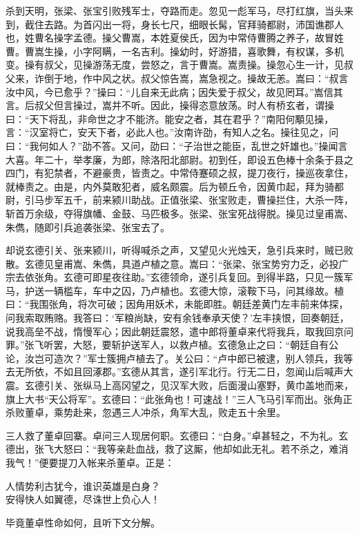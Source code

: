 \documentclass[a4paper]{article}
\begin{document}
杀到天明，张梁、张宝引败残军士，夺路而走。忽见一彪军马，尽打红旗，当头来到，截住去路。为首闪出一将，身长七尺，细眼长髯，官拜骑都尉，沛国谯郡人也，姓曹名操字孟德。操父曹嵩，本姓夏侯氏，因为中常侍曹腾之养子，故冒姓曹。曹嵩生操，小字阿瞒，一名吉利。操幼时，好游猎，喜歌舞，有权谋，多机变。操有叔父，见操游荡无度，尝怒之，言于曹嵩。嵩责操。操忽心生一计，见叔父来，诈倒于地，作中风之状。叔父惊告嵩，嵩急视之。操故无恙。嵩曰：“叔言汝中风，今已愈乎？”操曰：“儿自来无此病；因失爱于叔父，故见罔耳。”嵩信其言。后叔父但言操过，嵩并不听。因此，操得恣意放荡。时人有桥玄者，谓操曰：“天下将乱，非命世之才不能济。能安之者，其在君乎？”南阳何顒见操，言：“汉室将亡，安天下者，必此人也。”汝南许劭，有知人之名。操往见之，问曰：“我何如人？”劭不答。又问，劭曰：“子治世之能臣，乱世之奸雄也。”操闻言大喜。年二十，举孝廉，为郎，除洛阳北部尉。初到任，即设五色棒十余条于县之四门，有犯禁者，不避豪贵，皆责之。中常侍蹇硕之叔，提刀夜行，操巡夜拿住，就棒责之。由是，内外莫敢犯者，威名颇震。后为顿丘令，因黄巾起，拜为骑都尉，引马步军五千，前来颍川助战。正值张梁、张宝败走，曹操拦住，大杀一阵，斩首万余级，夺得旗幡、金鼓、马匹极多。张梁、张宝死战得脱。操见过皇甫嵩、朱儁，随即引兵追袭张梁、张宝去了。

却说玄德引关、张来颍川，听得喊杀之声，又望见火光烛天，急引兵来时，贼已败散。玄德见皇甫嵩、朱儁，具道卢植之意。嵩曰：“张梁、张宝势穷力乏，必投广宗去依张角。玄德可即星夜往助。”玄德领命，遂引兵复回。到得半路，只见一簇军马，护送一辆槛车，车中之囚，乃卢植也。玄德大惊，滚鞍下马，问其缘故。植曰：“我围张角，将次可破；因角用妖术，未能即胜。朝廷差黄门左丰前来体探，问我索取贿赂。我答曰：‘军粮尚缺，安有余钱奉承天使？’左丰挟恨，回奏朝廷，说我高垒不战，惰慢军心；因此朝廷震怒，遣中郎将董卓来代将我兵，取我回京问罪。”张飞听罢，大怒，要斩护送军人，以救卢植。玄德急止之曰：“朝廷自有公论，汝岂可造次？”军士簇拥卢植去了。关公曰：“卢中郎已被逮，别人领兵，我等去无所依，不如且回涿郡。”玄德从其言，遂引军北行。行无二日，忽闻山后喊声大震。玄德引关、张纵马上高冈望之，见汉军大败，后面漫山塞野，黄巾盖地而来，旗上大书“天公将军”。玄德曰：“此张角也！可速战！”三人飞马引军而出。张角正杀败董卓，乘势赴来，忽遇三人冲杀，角军大乱，败走五十余里。

三人救了董卓回寨。卓问三人现居何职。玄德曰：“白身。”卓甚轻之，不为礼。玄德出，张飞大怒曰：“我等亲赴血战，救了这厮，他却如此无礼。若不杀之，难消我气！”便要提刀入帐来杀董卓。正是：
\begin{center}
    \kaishu
    人情势利古犹今，谁识英雄是白身？\\
    安得快人如翼德，尽诛世上负心人！
\end{center}
毕竟董卓性命如何，且听下文分解。
\end{document}
